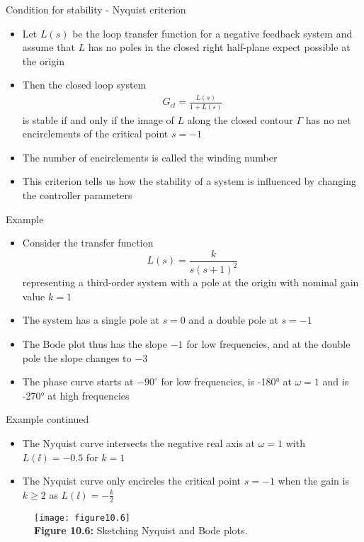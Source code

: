 \documentclass{beamer-control}
\begin{document}
\begin{frame}{Condition for stability - Nyquist criterion}
\begin{itemize}
\item Let $L(s)$ be the loop transfer function for a negative feedback system and assume that $L$ has no poles in the closed right half-plane expect possible at the origin
\item Then the closed loop system 
\begin{align}
G_{cl}=\frac{L(s)}{1+L(s)}
\end{align}
is stable if and only if the image of $L$ along the closed contour $\Gamma$ has no net encirclements of the critical point $s=-1$
\item The number of encirclements is called the winding number
\item This criterion tells us how the stability of a system is influenced by changing the controller parameters
\end{itemize}
\end{frame}


\begin{frame}{Example}
\begin{itemize}
	\item Consider the transfer function 
	\[L(s) = \frac{k}{s(s+1)^2}\] 
	representing a third-order system with a pole at the origin with nominal gain value $k=1$
	\item The system has a single pole at $s=0$ and a double pole at $s=-1$
	\item The Bode plot thus has the slope $-1$ for low frequencies, and at the double pole the slope changes to $-3$
	\item The phase curve starts at $-90^\circ$ for low frequencies, is \ang{-180} at $\omega=1$ and is \ang{-270} at high frequencies
\end{itemize}
\end{frame}


\begin{frame}{Example continued}
	\begin{itemize}
		\item The Nyquist curve intersects the negative real axis at $\omega=1$ with $L(\ii)=-0.5$ for $k=1$
		\item The Nyquist curve only encircles the critical point $s=-1$ when the gain is $k\geq 2$ as $L(\ii)=-\tfrac{k}{2}$
	\end{itemize}
\begin{figure}
	\centering
	\texttt{[image: figure10.6]}
	\\
	\textbf{Figure 10.6:} Sketching Nyquist and Bode plots.
\end{figure}
\end{frame}

\SUMMARYFRAME
\FINALE
\end{document}
